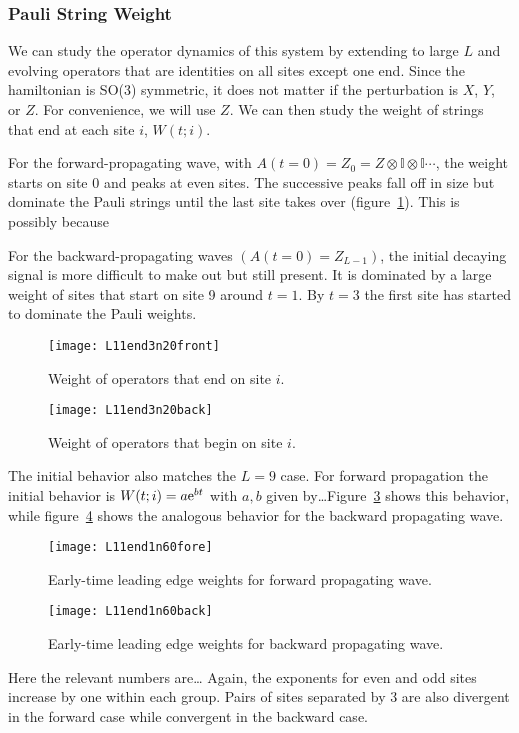 \subsubsection{Pauli String Weight} \label{subsub:operator_dynamics}  

We can study the operator dynamics of this system by extending to large $L$ and evolving operators that are identities on all sites except one end. Since the hamiltonian is SO(3) symmetric, it does not matter if the perturbation is $X$, $Y$, or $Z$. For convenience, we will use $Z$. We can then study the weight of strings that end at each site $i$, $W(t; i)$.

For the forward-propagating wave, with $A(t=0) = Z_0 = Z\otimes \mathbb{I} \otimes \mathbb{I} \cdots$, the weight starts on site 0 and peaks at even sites. The successive peaks fall off in size but dominate the Pauli strings until the last site takes over (figure~\ref{fig:L11end3n20front}). This is possibly because 

For the backward-propagating waves $(A(t=0)=Z_{L-1})$, the initial decaying signal is more difficult to make out but still present. It is dominated by a large weight of sites that start on site 9 around $t=1$. By $t = 3$ the first site has started to dominate the Pauli weights.

\begin{figure}
	\centering
	\texttt{[image: L11end3n20front]}
	\caption{Weight of operators that end on site $i$.}
	\label{fig:L11end3n20front}
\end{figure}
\begin{figure}
	\centering
	\texttt{[image: L11end3n20back]}
	\caption{Weight of operators that begin on site $i$.}
	\label{fig:L11end3n20back}
\end{figure}

The initial behavior also matches the $L=9$ case. For forward propagation the initial behavior is $W(t;i) = a\text{e}^{bt}$ with $a,b$ given by\dots Figure~\ref{fig:L11end1n60fore} shows this behavior, while figure~\ref{fig:L11end1n60back} shows the analogous behavior for the backward propagating wave. 

\begin{figure}
	\centering
	\texttt{[image: L11end1n60fore]}
	\caption{Early-time leading edge weights for forward propagating wave.}
	\label{fig:L11end1n60fore}
\end{figure}
\begin{figure}
	\centering
	\texttt{[image: L11end1n60back]}
	\caption{Early-time leading edge weights for backward propagating wave.}
	\label{fig:L11end1n60back}
\end{figure}

Here the relevant numbers are\dots
Again, the exponents for even and odd sites increase by one within each group. Pairs of sites separated by 3 are also divergent in the forward case while convergent in the backward case.